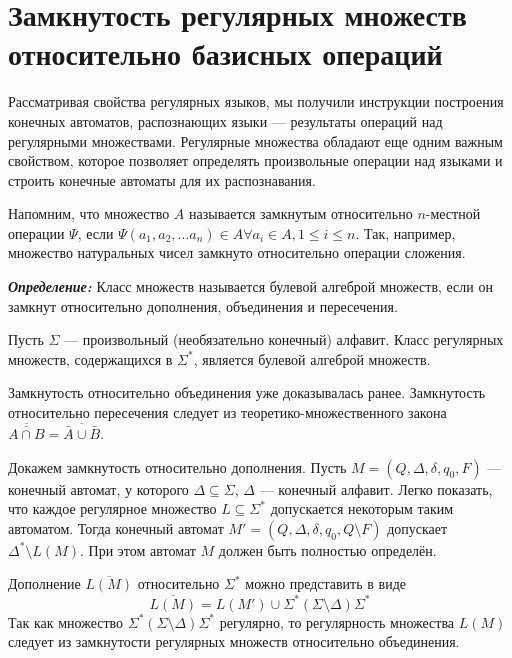 \section{Замкнутость регулярных множеств относительно базисных операций}
\label{Chapter5Closure}

Рассматривая свойства регулярных языков, мы получили инструкции построения конечных автоматов, распознающих языки --- результаты операций над регулярными множествами. Регулярные множества обладают еще одним важным свойством, которое позволяет определять произвольные операции над языками и строить конечные автоматы для их распознавания.

Напомним, что множество $A$ называется замкнутым относительно $n$-местной операции $\Psi$, если $\Psi(a_1, a_2, \ldots a_n) \in A \forall a_i \in A, 1 \leq i \leq n $. Так, например, множество натуральных чисел замкнуто относительно операции сложения. 

\textbf{\textit{Определение:}} Класс множеств называется булевой алгеброй множеств, если он замкнут относительно дополнения, объединения и пересечения.

\begin{mytheorem}
Пусть $\Sigma$ --- произвольный (необязательно конечный) алфавит. Класс регулярных множеств, содержащихся в $\Sigma^*$, является булевой алгеброй множеств.
\end{mytheorem}
\begin{myproof}
Замкнутость относительно объединения уже доказывалась ранее. Замкнутость относительно пересечения следует из теоретико-множественного закона $\overline{\overline{ A \cap B }} = \overline {\bar A \cup \bar B}$.

Докажем замкнутость относительно дополнения. Пусть $M = (Q, \Delta, \delta, q_0, F)$ --- конечный автомат, у которого $\Delta \subseteq \Sigma$, $\Delta$ --- конечный алфавит. Легко показать, что каждое регулярное множество $L \subseteq \Sigma^* $ допускается некоторым таким автоматом. Тогда конечный автомат $M' = (Q, \Delta, \delta, q_0, Q \setminus F)$ допускает $\Delta^* \setminus L(M)$. При этом автомат $M$ должен быть полностью определён. 

Дополнение $\overline {L(M)}$ относительно $\Sigma^*$ можно представить в виде 
\[
\overline {L(M)} = L(M') \cup \Sigma^*(\Sigma \setminus \Delta)\Sigma^*
\]
Так как множество $\Sigma^*(\Sigma \setminus \Delta)\Sigma^*$ регулярно, то регулярность множества $L(M)$ следует из замкнутости регулярных множеств относительно объединения.
\end{myproof}

